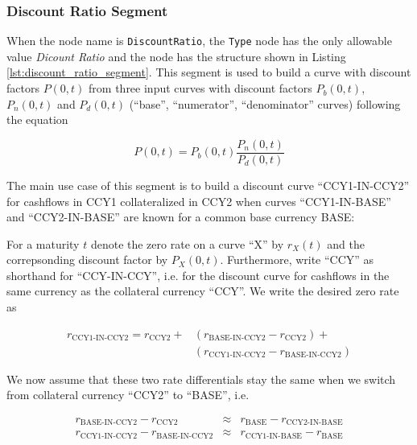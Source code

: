 \subsubsection*{Discount Ratio Segment}
\label{sec:dicount_ratio_segment}

When the node name is \lstinline!DiscountRatio!, the \lstinline!Type! node has the only allowable value \emph{Dicount
Ratio} and the node has the structure shown in Listing \ref{lst:discount_ratio_segment}. This segment is used to build a
curve with discount factors $P(0,t)$ from three input curves with discount factors $P_b(0,t)$, $P_n(0,t)$ and $P_d(0,t)$
(``base'', ``numerator'', ``denominator'' curves) following the equation

\begin{equation}\label{discount_ratio_df}
  P(0,t) = P_b(0,t) \frac{P_n(0,t)}{P_d(0,t)}
\end{equation}

The main use case of this segment is to build a discount curve ``CCY1-IN-CCY2'' for cashflows in CCY1 collateralized in
CCY2 when curves ``CCY1-IN-BASE'' and ``CCY2-IN-BASE'' are known for a common base currency BASE:

For a maturity $t$ denote the zero rate on a curve ``X'' by $r_X(t)$ and the correpsonding discount factor by
$P_X(0,t)$. Furthermore, write ``CCY'' as shorthand for ``CCY-IN-CCY'', i.e. for the discount curve for cashflows in the
same currency as the collateral currency ``CCY''. We write the desired zero rate as

\begin{equation}\label{discount_ratio_rates}
  \begin{split}
    r_{\text{CCY1-IN-CCY2}} = r_{\text{CCY2}} + & ( r_{\text{BASE-IN-CCY2}} - r_{\text{CCY2}} ) + \\
                               & (r_{\text{CCY1-IN-CCY2}} - r_{\text{BASE-IN-CCY2}})
  \end{split}
\end{equation}

We now assume that these two rate differentials stay the same when we switch from collateral currency ``CCY2'' to
``BASE'', i.e.

\begin{eqnarray}
r_{\text{BASE-IN-CCY2}} - r_{\text{CCY2}} &\approx& r_{\text{BASE}} - r_{\text{CCY2-IN-BASE}} \label{discount_ratio_rate1} \\
r_{\text{CCY1-IN-CCY2}} - r_{\text{BASE-IN-CCY2}} &\approx& r_{\text{CCY1-IN-BASE}} - r_{\text{BASE}}  \label{discount_ratio_rate2}
\end{eqnarray}

